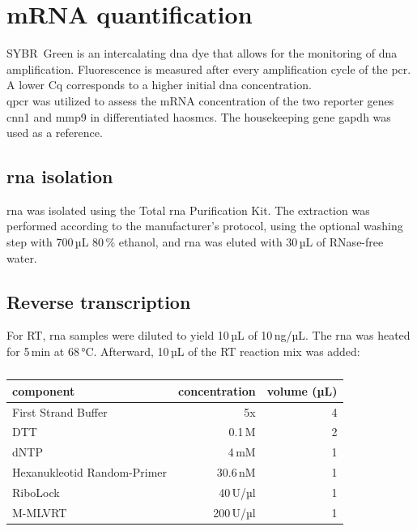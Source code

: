 \section{mRNA quantification}
\label{sec:qpcr}
SYBR\textregistered~Green is an intercalating \ac{dna} dye that allows for the monitoring of \ac{dna} amplification. Fluorescence is measured after every amplification cycle of the \ac{pcr}. A lower \ac{Cq} corresponds to a higher initial \ac{dna} concentration. \cite{huggettStandardisationReportingNucleic2011}\\
\Ac{qpcr} was utilized to assess the \ac{mRNA} concentration of the two reporter genes \ac{cnn1} and \ac{mmp9} in differentiated \acp{haosmc}. The housekeeping gene \ac{gapdh} was used as a reference.


    \subsection{\ac{rna} isolation}
    \ac{rna} was isolated using the Total \ac{rna} Purification Kit. The extraction was performed according to the manufacturer's protocol, using the optional washing step with 700\,µL 80\,\% ethanol, and \ac{rna} was eluted with 30\,µL of RNase-free water.

    \subsection{Reverse transcription}
    For \ac{RT}, \ac{rna} samples were diluted to yield 10\,µL of 10\,ng/µL. The \ac{rna} was heated for 5\,min at 68\,°C. Afterward, 10\,µL of the \ac{RT} reaction mix was added:

    \begin{table}[h]
    \capstart
	\centering
	\begin{minipage}{\captionwidth}
	   	\caption[RT mastermix]{}
	   	\label{tab:RT Mastr Mix}
	\end{minipage}
    \begin{tabular}{|l|r|r|}
        \hline
        component               & concentration & volume (µL) \\ \hline
        First Strand Buffer     & 5x            & 4           \\
        \acs{DTT}               & 0.1\,M               & 2           \\
        \acs{dNTP}              & 4\,mM               & 1           \\
        Hexanukleotid Random-Primer  & 30.6\,nM               & 1           \\
        RiboLock                & 40\,U/µl                & 1           \\
        M-MLVRT                 & 200\,U/µl               & 1           \\ \hline
    \end{tabular}
    \end{table}

